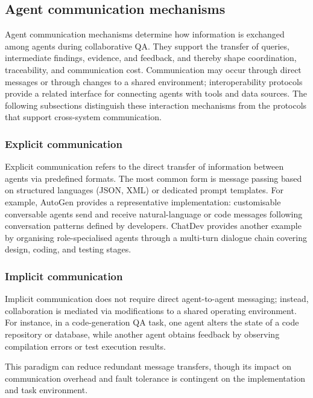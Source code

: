 \documentclass[a4paper,fleqn]{cas-dc}
\begin{document}
\subsection{Agent communication mechanisms}
\label{sec:comm}

Agent communication mechanisms determine how information is exchanged among
agents during collaborative QA. They support the transfer of queries,
intermediate findings, evidence, and feedback, and thereby shape coordination,
traceability, and communication cost. Communication may occur through direct
messages or through changes to a shared environment; interoperability
protocols provide a related interface for connecting agents with tools and
data sources. The following subsections distinguish these interaction
mechanisms from the protocols that support cross-system communication.

\subsubsection{Explicit communication}
\label{sec:explicit_comm}

Explicit communication refers to the direct transfer of information between agents via predefined formats.
The most common form is message passing based on structured languages (JSON,
XML) or dedicated prompt templates.
For example, AutoGen \citep{wu2024autogen} provides a representative implementation:
customisable conversable agents send and receive natural-language or code
messages following conversation patterns defined by developers.
ChatDev \citep{qian2023chatdev} provides another example by organising role-specialised agents
through a multi-turn dialogue chain covering design, coding, and testing stages.


\subsubsection{Implicit communication}
\label{sec:implicit_comm}

Implicit communication does not require direct agent-to-agent messaging; instead, collaboration is mediated via modifications to a shared operating environment.
For instance, in a code-generation QA task, one agent alters the state of a code repository or database, while another agent obtains feedback by observing compilation errors or test execution results.

This paradigm can reduce redundant message transfers, though its impact on communication overhead and fault tolerance is contingent on the implementation and task environment.
\end{document}
